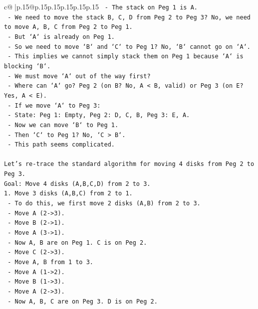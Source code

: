\documentclass{article}
\begin{document}
{\begin{supertabular}{c@{$\;$}|p{.15\linewidth}@{}p{.15\linewidth}p{.15\linewidth}p{.15\linewidth}p{.15\linewidth}p{.15\linewidth}}
{{{\texttt{    {-} The stack on Peg 1 is A.} \\
\texttt{    {-} We need to move the stack B, C, D from Peg 2 to Peg 3? No, we need to move A, B, C from Peg 2 to Peg 1.} \\
\texttt{    {-} But `A` is already on Peg 1.} \\
\texttt{    {-} So we need to move `B` and `C` to Peg 1? No, `B` cannot go on `A`.} \\
\texttt{    {-} This implies we cannot simply stack them on Peg 1 because `A` is blocking `B`.} \\
\texttt{    {-} We must move `A` out of the way first?} \\
\texttt{    {-} Where can `A` go? Peg 2 (on B? No, A < B, valid) or Peg 3 (on E? Yes, A < E).} \\
\texttt{    {-} If we move `A` to Peg 3:} \\
\texttt{      {-} State: Peg 1: Empty, Peg 2: D, C, B, Peg 3: E, A.} \\
\texttt{      {-} Now we can move `B` to Peg 1.} \\
\texttt{      {-} Then `C` to Peg 1? No, `C > B`.} \\
\texttt{      {-} This path seems complicated.} \\
\\ 
\texttt{Let's re{-}trace the standard algorithm for moving 4 disks from Peg 2 to Peg 3.} \\
\texttt{Goal: Move 4 disks (A,B,C,D) from 2 to 3.} \\
\texttt{1. Move 3 disks (A,B,C) from 2 to 1.} \\
\texttt{   {-} To do this, we first move 2 disks (A,B) from 2 to 3.} \\
\texttt{     {-} Move A (2{-}>3).} \\
\texttt{     {-} Move B (2{-}>1).} \\
\texttt{     {-} Move A (3{-}>1).} \\
\texttt{   {-} Now A, B are on Peg 1. C is on Peg 2.} \\
\texttt{   {-} Move C (2{-}>3).} \\
\texttt{   {-} Move A, B from 1 to 3.} \\
\texttt{     {-} Move A (1{-}>2).} \\
\texttt{     {-} Move B (1{-}>3).} \\
\texttt{     {-} Move A (2{-}>3).} \\
\texttt{   {-} Now A, B, C are on Peg 3. D is on Peg 2.} \\
}}}
\end{supertabular}}
\end{document}
